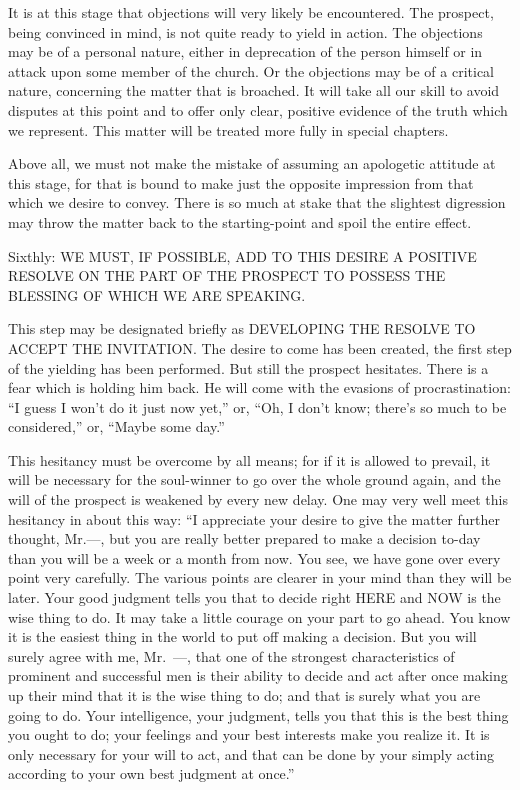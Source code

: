 \documentclass[
]{book}
\begin{document}
It is at this stage that objections will very likely be encountered. The prospect, being convinced in mind, is not quite ready to yield in action. The objections may be of a personal nature, either in deprecation of the person himself or in attack upon some member of the church. Or the objections may be of a critical nature, concerning the matter that is broached. It will take all our skill to avoid disputes at this point and to offer only clear, positive evidence of the truth which we represent. This matter will be treated more fully in special chapters.

Above all, we must not make the mistake of assuming an apologetic attitude at this stage, for that is bound to make just the opposite impression from that which we desire to convey. There is so much at stake that the slightest digression may throw the matter back to the starting-point and spoil the entire effect.

Sixthly: WE MUST, IF POSSIBLE, ADD TO THIS DESIRE A POSITIVE RESOLVE ON THE PART OF THE PROSPECT TO POSSESS THE BLESSING OF WHICH WE ARE SPEAKING.

This step may be designated briefly as DEVELOPING THE RESOLVE TO ACCEPT THE INVITATION. The desire to come has been created, the first step of the yielding has been performed. But still the prospect hesitates. There is a fear which is holding him back. He will come with the evasions of procrastination: ``I guess I won't do it just now yet,'' or, ``Oh, I don't know; there's so much to be considered,'' or, ``Maybe some day.''

This hesitancy must be overcome by all means; for if it is allowed to prevail, it will be necessary for the soul-winner to go over the whole ground again, and the will of the prospect is weakened by every new delay. One may very well meet this hesitancy in about this way: ``I appreciate your desire to give the matter further thought, Mr.---, but you are really better prepared to make a decision to-day than you will be a week or a month from now. You see, we have gone over every point very carefully. The various points are clearer in your mind than they will be later. Your good judgment tells you that to decide right HERE and NOW is the wise thing to do. It may take a little courage on your part to go ahead. You know it is the easiest thing in the world to put off making a decision. But you will surely agree with me, Mr.~---, that one of the strongest characteristics of prominent and successful men is their ability to decide and act after once making up their mind that it is the wise thing to do; and that is surely what you are going to do. Your intelligence, your judgment, tells you that this is the best thing you ought to do; your feelings and your best interests make you realize it. It is only necessary for your will to act, and that can be done by your simply acting according to your own best judgment at once.''
\end{document}
